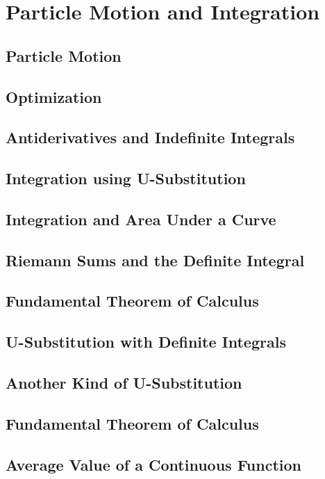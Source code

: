 \documentclass[../bccalc.tex]{subfiles}
\begin{document}
\chapter{Particle Motion and Integration}
\section{Particle Motion}

\section{Optimization}

\section{Antiderivatives and Indefinite Integrals}

\section{Integration using U-Substitution}

\section{Integration and Area Under a Curve}

\section{Riemann Sums and the Definite Integral}

\section{Fundamental Theorem of Calculus}

\section{U-Substitution with Definite Integrals}

\section{Another Kind of U-Substitution}

\section{Fundamental Theorem of Calculus}

\section{Average Value of a Continuous Function}
\end{document}
